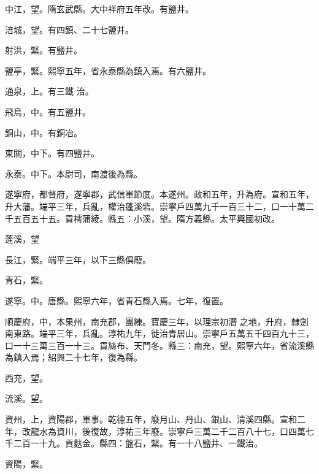 \begin{pinyinscope}
 中江，望。隋玄武縣。大中祥府五年改。有鹽井。



 涪城，望。有四鎮、二十七鹽井。



 射洪，緊。有鹽井。



 鹽亭，緊。熙寧五年，省永泰縣為鎮入焉。有六鹽井。



 通泉，上。有三鐵
 治。



 飛烏，中。有五鹽井。



 銅山，中。有銅冶。



 東關，中下。有四鹽井。



 永泰。中下。本尉司，南渡後為縣。



 遂寧府，都督府，遂寧郡，武信軍節度。本遂州。政和五年，升為府。宣和五年，升大藩。端平三年，兵亂，權治蓬溪砦。崇寧戶四萬九千一百三十二，口一十萬二千五百五十五。貢樗蒲綾。縣五：小溪，望。隋方義縣。太平興國初改。



 蓬溪，望



 長江，緊。端平三年，以下三縣俱廢。



 青石，緊。



 遂寧。中。唐縣。熙寧六年，省青石縣入焉。七年，復置。



 順慶府，中，本果州，南充郡，團練。寶慶三年，以理宗初潛
 之地，升府，隸劍南東路。端平三年，兵亂。淳祐九年，徙治青居山。崇寧戶五萬五千四百九十三，口一十三萬三百一十三。貢絲布、天門冬。縣三：南充，望。熙寧六年，省流溪縣為鎮入焉；紹興二十七年，復為縣。



 西充，望。



 流溪。望。



 資州，上，資陽郡，軍事。乾德五年，廢月山、丹山、銀山、清溪四縣。宣和二年，改龍水為資川，後復故，淳祐三年廢。崇寧戶三萬二千二百八十七，口四萬七千二百一十九。貢麩金。縣四：盤石，緊。有一十八鹽井、一鐵治。



 資陽，緊。




\end{pinyinscope}

